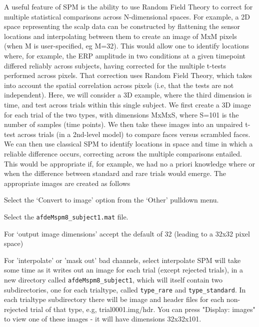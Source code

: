  A useful feature of SPM is the ability to use Random Field Theory to correct for multiple statistical comparisons across N-dimensional spaces. For example, a 2D space representing the scalp data can be constructed by flattening the sensor locations and interpolating between them to create an image of MxM pixels (when M is user-specified, eg M=32). This would allow one to identify locations where, for example, the ERP amplitude in two conditions at a given timepoint differed reliably across subjects, having corrected for the multiple t-tests performed across pixels. That correction uses Random Field Theory, which takes into account the spatial correlation across pixels (i.e, that the tests are not independent). 
Here, we will consider a 3D example, where the third dimension is time, and test across trials within this single subject. We first create a 3D image for each trial of the two types, with dimensions MxMxS, where S=101 is the number of samples (time points). We then take these images into an unpaired t-test across trials (in a 2nd-level model) to compare faces versus scrambled faces. We can then use classical SPM to identify locations in space and time in which a reliable difference occurs, correcting across the multiple comparisons entailed. This would be appropriate if, for example, we had no a priori knowledge where or when the difference between standard and rare trials would emerge. The appropriate images are created as follows
\bi
\item{Select the `Convert to image' option from the `Other' pulldown menu.}
\item{Select the \texttt{afdeMspm8\_subject1.mat} file.}
\item{For `output image dimensions' accept the default of 32 (leading to a 32x32 pixel space)}
\item{For 'interpolate' or 'mask out' bad channels, select interpolate}
\ei
SPM will take some time as it writes out an image for each trial (except rejected trials), in a new directory called \texttt{afdeMspm8\_subject1}, which will itself contain two subdirectories, one for each trialtype, called \texttt{type\_rare} and \texttt{type\_standard}. In each trialtype subdirectory there will be image and header files for each non-rejected trial of that type, e.g, trial0001.img/hdr. You can press "Display: images" to view one of these images - it will have dimensions 32x32x101.

